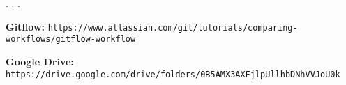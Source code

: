 . . .

{\bfseries Gitflow\+:} {\tt https\+://www.\+atlassian.\+com/git/tutorials/comparing-\/workflows/gitflow-\/workflow}

{\bfseries Google Drive\+:} {\tt https\+://drive.\+google.\+com/drive/folders/0\+B5\+A\+M\+X3\+A\+X\+Fjlp\+Ullhb\+D\+Nh\+V\+V\+Jo\+U0k} 